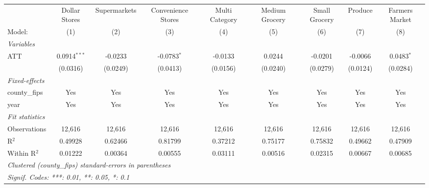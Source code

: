 
\begingroup
\centering
\begin{tabular}{lcccccccc}
   \tabularnewline \midrule \midrule
                        & Dollar Stores   & Supermarkets                & Convenience Stores               & Multi Category                & Medium Grocery                & Small Grocery                & Produce              & Farmers Market \\   
   Model:               & (1)             & (2)                         & (3)                              & (4)                           & (5)                           & (6)                          & (7)                  & (8)\\  
   \midrule
   \emph{Variables}\\
   ATT                  & 0.0914$^{***}$  & -0.0233                     & -0.0783$^{*}$                    & -0.0133                       & 0.0244                        & -0.0201                      & -0.0066              & 0.0483$^{*}$\\   
                        & (0.0316)        & (0.0249)                    & (0.0413)                         & (0.0156)                      & (0.0240)                      & (0.0279)                     & (0.0124)             & (0.0284)\\   
   \midrule
   \emph{Fixed-effects}\\
   county\_fips         & Yes             & Yes                         & Yes                              & Yes                           & Yes                           & Yes                          & Yes                  & Yes\\  
   year                 & Yes             & Yes                         & Yes                              & Yes                           & Yes                           & Yes                          & Yes                  & Yes\\  
   \midrule
   \emph{Fit statistics}\\
   Observations         & 12,616          & 12,616                      & 12,616                           & 12,616                        & 12,616                        & 12,616                       & 12,616               & 12,616\\  
   R$^2$                & 0.49928         & 0.62466                     & 0.81799                          & 0.37212                       & 0.75177                       & 0.75832                      & 0.49662              & 0.47909\\  
   Within R$^2$         & 0.01222         & 0.00364                     & 0.00555                          & 0.03111                       & 0.00516                       & 0.02315                      & 0.00667              & 0.00685\\  
   \midrule \midrule
   \multicolumn{9}{l}{\emph{Clustered (county\_fips) standard-errors in parentheses}}\\
   \multicolumn{9}{l}{\emph{Signif. Codes: ***: 0.01, **: 0.05, *: 0.1}}\\
\end{tabular}
\par\endgroup


